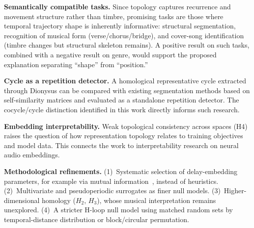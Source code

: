 \textbf{Semantically compatible tasks.} Since topology captures recurrence and movement structure rather than timbre, promising tasks are those where temporal trajectory shape is inherently informative: structural segmentation, recognition of musical form (verse/chorus/bridge), and cover-song identification (timbre changes but structural skeleton remains). A positive result on such tasks, combined with a negative result on genre, would support the proposed explanation separating ``shape'' from ``position.''

\textbf{Cycle as a repetition detector.} A homological representative cycle extracted through Dionysus can be compared with existing segmentation methods based on self-similarity matrices and evaluated as a standalone repetition detector. The cocycle/cycle distinction identified in this work directly informs such research.

\textbf{Embedding interpretability.} Weak topological consistency across spaces (H4) raises the question of how representation topology relates to training objectives and model data. This connects the work to interpretability research on neural audio embeddings.

\textbf{Methodological refinements.} (1)~Systematic selection of delay-embedding parameters, for example via mutual information~\cite{fraser1986independent}, instead of heuristics. (2)~Multivariate and pseudoperiodic surrogates as finer null models. (3)~Higher-dimensional homology ($H_2$, $H_3$), whose musical interpretation remains unexplored. (4)~A stricter H-loop null model using matched random sets by temporal-distance distribution or block/circular permutation.
